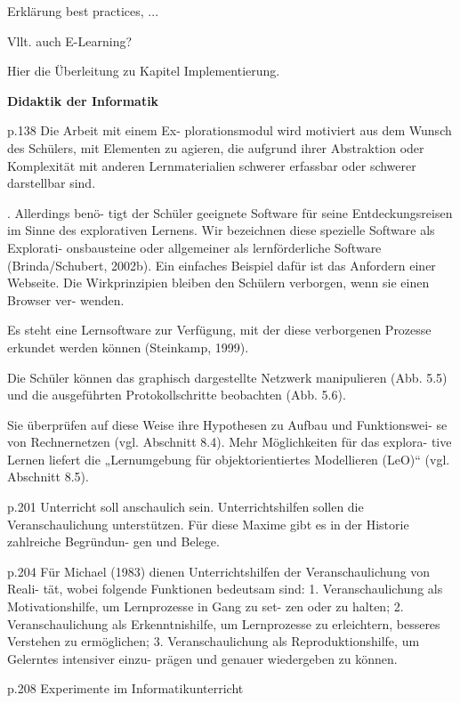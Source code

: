 \begin{mdframed}
Erklärung best practices, ...

Vllt. auch E-Learning?

Hier die Überleitung zu Kapitel Implementierung. 
\end{mdframed}

\textbf{Didaktik der Informatik}

p.138
 Die Arbeit mit einem Ex-
plorationsmodul wird motiviert aus dem Wunsch des Schülers, mit Elementen 
zu  agieren,  die  aufgrund  ihrer  Abstraktion  oder  Komplexität  mit  anderen 
Lernmaterialien schwerer erfassbar oder schwerer darstellbar sind. 

. Allerdings benö-
tigt der Schüler geeignete Software für seine Entdeckungsreisen im Sinne des 
explorativen  Lernens.  Wir  bezeichnen  diese  spezielle  Software  als  Explorati-
onsbausteine  oder  allgemeiner  als  lernförderliche  Software (Brinda/Schubert, 
2002b).  Ein  einfaches  Beispiel  dafür  ist  das  Anfordern  einer  Webseite.  Die 
Wirkprinzipien bleiben den Schülern verborgen, wenn sie einen Browser ver-
wenden. 

Es steht eine Lernsoftware zur Verfügung, mit der diese verborgenen Prozesse 
erkundet werden können (Steinkamp, 1999). 
 
Die  Schüler  können  das  graphisch  dargestellte  Netzwerk  manipulieren  (Abb. 
5.5) und die ausgeführten Protokollschritte beobachten (Abb. 5.6). 

Sie überprüfen auf diese Weise ihre Hypothesen zu Aufbau und Funktionswei-
se von Rechnernetzen (vgl. Abschnitt 8.4). Mehr Möglichkeiten für das explora-
tive  Lernen  liefert  die  „Lernumgebung  für  objektorientiertes  Modellieren 
(LeO)“ (vgl. Abschnitt 8.5). 

p.201
Unterricht soll anschaulich sein. Unterrichtshilfen sollen die Veranschaulichung 
unterstützen. Für diese Maxime gibt es in der Historie zahlreiche Begründun-
gen und Belege. 

p.204
Für Michael (1983) dienen Unterrichtshilfen der Veranschaulichung von Reali-
tät, wobei folgende Funktionen bedeutsam sind: 
1.  Veranschaulichung als Motivationshilfe, um Lernprozesse in Gang zu set-
zen oder zu halten; 
2.  Veranschaulichung  als  Erkenntnishilfe,  um  Lernprozesse  zu  erleichtern, 
besseres Verstehen zu ermöglichen; 
3.  Veranschaulichung als Reproduktionshilfe, um Gelerntes intensiver einzu-
prägen und genauer wiedergeben zu können. 

p.208
Experimente im Informatikunterricht 

